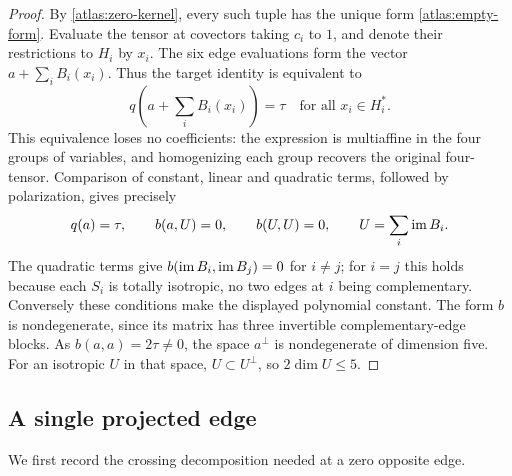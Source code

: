 \begin{proof}
By \eqref{atlas:zero-kernel}, every such tuple has the unique form
\eqref{atlas:empty-form}.  Evaluate the tensor at covectors taking \(c_i\)
to \(1\), and denote their restrictions to \(H_i\) by \(x_i\).
The six edge evaluations form the vector
\(a+\sum_i B_i(x_i)\).  Thus the target identity is equivalent to
\[
 q\left(a+\sum_iB_i(x_i)\right)=\tau
 \quad\text{for all }x_i\in H_i^*.
\]
This equivalence loses no coefficients: the expression is multiaffine in
the four groups of variables, and homogenizing each group recovers the
original four-tensor.  Comparison of constant, linear and quadratic terms,
followed by polarization, gives precisely
\[
 q(a)=\tau,\qquad b(a,U)=0,\qquad b(U,U)=0,
 \qquad U=\sum_i\operatorname{im} B_i.
\]
The quadratic terms give \(b(\operatorname{im} B_i,\operatorname{im} B_j)=0\) for \(i\ne j\); for
\(i=j\) this holds because each \(S_i\) is totally isotropic, no two
edges at \(i\) being complementary.
Conversely these conditions make the displayed polynomial constant.
The form \(b\) is nondegenerate, since its matrix has three invertible
complementary-edge blocks.  As \(b(a,a)=2\tau\ne0\), the space \(a^\perp\)
is nondegenerate of dimension five.  For an isotropic \(U\) in that space,
\(U\subset U^\perp\), so \(2\dim U\le5\).
\end{proof}

\subsection{A single projected edge}

We first record the crossing decomposition needed at a zero opposite edge.


